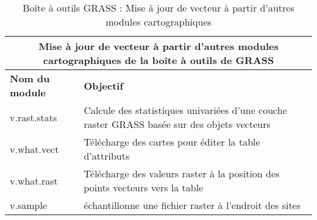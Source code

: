 \begin{table}[H]
\centering
 \begin{tabular}{|p{4cm}|p{10cm}|}
  \hline \multicolumn{2}{|c|}{\textbf{Mise à jour de vecteur à partir d'autres modules cartographiques de la boîte à outils de GRASS}} \\
  \hline \textbf{Nom du module} & \textbf{Objectif} \\
  \hline v.rast.stats & Calcule des statistiques univariées d'une couche raster GRASS basée sur des objets vecteurs\\
  \hline v.what.vect & Télécharge des cartes pour éditer la table d'attributs\\
  \hline v.what.rast & Télécharge des valeurs raster à la position des points vecteurs vers la table\\
  \hline v.sample & échantillonne une fichier raster à l'endroit des sites\\
\hline
\end{tabular}
\caption{Boîte à outils GRASS : Mise à jour de vecteur à partir d'autres modules cartographiques}
\end{table}

\vspace{-0.5cm}

